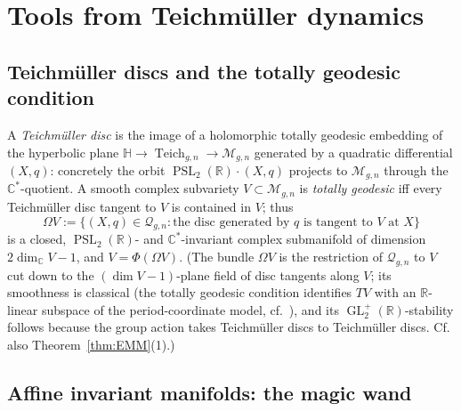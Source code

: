 \documentclass[11pt]{article}
\newcommand{\C}{\mathbb{C}}
\newcommand{\R}{\mathbb{R}}
\newcommand{\cQ}{\mathcal{Q}}
\newcommand{\M}{\mathcal{M}}
\DeclareMathOperator{\PSL}{PSL}
\DeclareMathOperator{\GL}{GL}
\DeclareMathOperator{\Teich}{Teich}
\theoremstyle{definition}
\theoremstyle{remark}
\begin{document}

\section{Tools from Teichm\"uller dynamics}
\label{sec:tools}

\subsection{Teichm\"uller discs and the totally geodesic condition}

A \emph{Teichm\"uller disc} is the image of a holomorphic totally geodesic
embedding of the hyperbolic plane
$\mathbb{H} \to \Teich_{g,n} \to \M_{g,n}$ generated by a quadratic
differential $(X,q)$: concretely the orbit $\PSL_2(\R) \cdot (X,q)$
projects to $\M_{g,n}$ through the $\C^*$-quotient. A smooth complex
subvariety $V \subset \M_{g,n}$ is \emph{totally geodesic} iff every
Teichm\"uller disc tangent to $V$ is contained in $V$; thus
\[
\Omega V := \{(X,q) \in \cQ_{g,n} : \text{the disc generated by } q
\text{ is tangent to } V \text{ at } X\}
\]
is a closed, $\PSL_2(\R)$- and $\C^*$-invariant complex submanifold of
dimension $2 \dim_{\C} V - 1$, and $V = \Phi(\Omega V)$.
(The bundle $\Omega V$ is the restriction of $\cQ_{g,n}$ to $V$ cut down
to the $(\dim V - 1)$-plane field of disc tangents along $V$; its
smoothness is classical (the totally geodesic condition identifies
$T V$ with an $\R$-linear subspace of the period-coordinate model, cf.\
\cite{Mukamel}), and its $\GL_2^+(\R)$-stability follows because the
group action takes Teichm\"uller discs to Teichm\"uller discs. Cf. also
Theorem~\ref{thm:EMM}(1).)

\subsection{Affine invariant manifolds: the magic wand}
\end{document}
